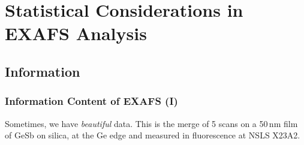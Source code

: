 \documentclass[10pt, xcolor=x11names, compress]{beamer}
\begin{document}
\section[Statistics]{Statistical Considerations in EXAFS Analysis}

\subsection[Information]{Information}
\begin{frame}
  \frametitle{Information Content of EXAFS (I)} 

  \small
  Sometimes, we have {\color{Green4}\textit{beautiful}} data.  This is
  the merge of 5 scans on a 50\,nm film of GeSb on silica, at the Ge
  edge and measured in fluorescence at NSLS X23A2.\\~


\end{frame}
\end{document}

